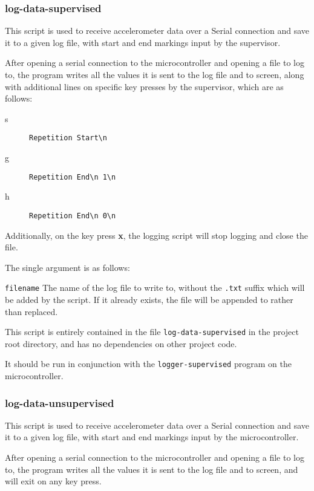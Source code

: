 \documentclass[a4paper]{article}
\begin{document}
\subsubsection{log-data-supervised}

This script is used to receive accelerometer data over a Serial connection and save it to a given log file, with start and end markings input by the supervisor.

After opening a serial connection to the microcontroller and opening a file to log to, the program writes all the values it is sent to the log file and to screen, along with additional lines on specific key presses by the supervisor, which are as follows:

\begin{description}
\item[s] \lstinline|Repetition Start\n|
\item[g] \lstinline|Repetition End\n 1\n|
\item[h] \lstinline|Repetition End\n 0\n|
\end{description}

Additionally, on the key press \textbf{x}, the logging script will stop logging and close the file.

The single argument is as follows:

\lstinline{filename} The name of the log file to write to, without the \lstinline{.txt} suffix which will be added by the script. If it already exists, the file will be appended to rather than replaced.

This script is entirely contained in the file \lstinline{log-data-supervised} in the project root directory, and has no dependencies on other project code.

It should be run in conjunction with the \lstinline{logger-supervised} program on the microcontroller.

\subsubsection{log-data-unsupervised}

This script is used to receive accelerometer data over a Serial connection and save it to a given log file, with start and end markings input by the microcontroller.

After opening a serial connection to the microcontroller and opening a file to log to, the program writes all the values it is sent to the log file and to screen, and will exit on any key press.
\end{document}

